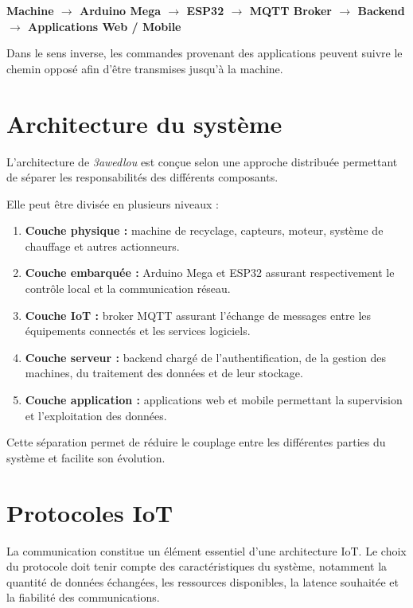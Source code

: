 \begin{center}
\textbf{
Machine $\rightarrow$ Arduino Mega $\rightarrow$ ESP32
$\rightarrow$ MQTT Broker $\rightarrow$ Backend
$\rightarrow$ Applications Web / Mobile
}
\end{center}

Dans le sens inverse, les commandes provenant des applications peuvent
suivre le chemin opposé afin d'être transmises jusqu'à la machine.

\section{Architecture du système}

L'architecture de \textit{3awedlou} est conçue selon une approche
distribuée permettant de séparer les responsabilités des différents
composants.

Elle peut être divisée en plusieurs niveaux :

\begin{enumerate}
    \item \textbf{Couche physique :} machine de recyclage, capteurs,
    moteur, système de chauffage et autres actionneurs.
    
    \item \textbf{Couche embarquée :} Arduino Mega et ESP32 assurant
    respectivement le contrôle local et la communication réseau.
    
    \item \textbf{Couche IoT :} broker MQTT assurant l'échange de
    messages entre les équipements connectés et les services logiciels.
    
    \item \textbf{Couche serveur :} backend chargé de l'authentification,
    de la gestion des machines, du traitement des données et de leur
    stockage.
    
    \item \textbf{Couche application :} applications web et mobile
    permettant la supervision et l'exploitation des données.
\end{enumerate}

Cette séparation permet de réduire le couplage entre les différentes
parties du système et facilite son évolution.

\section{Protocoles IoT}

La communication constitue un élément essentiel d'une architecture IoT.
Le choix du protocole doit tenir compte des caractéristiques du système,
notamment la quantité de données échangées, les ressources disponibles,
la latence souhaitée et la fiabilité des communications.

